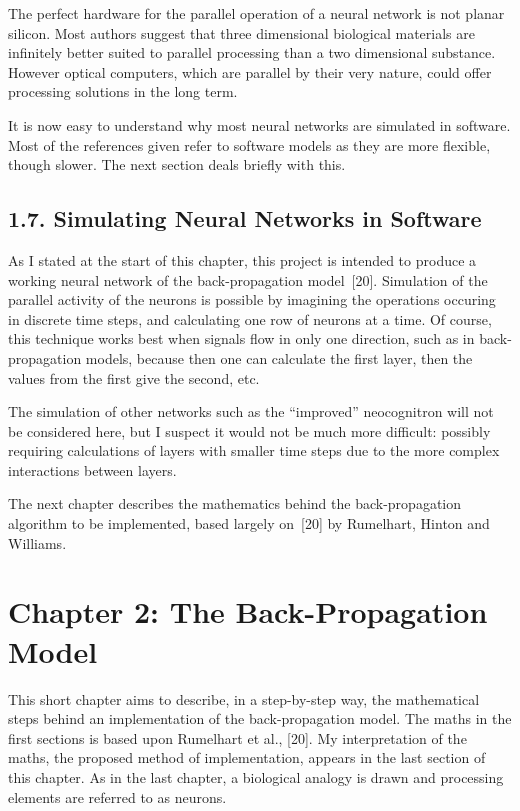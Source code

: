 \documentclass[12pt]{report}
\begin{document}
The perfect hardware for the parallel operation of a neural network is not planar
silicon.
Most authors suggest that three dimensional biological materials are
infinitely better suited to parallel processing than a two dimensional
substance.
However optical computers, which are parallel by their very nature, could
offer processing solutions in the long term.

It is now easy to understand why most neural networks are simulated in software.
Most of the references given refer to software models as they are more
flexible, though slower.
The next section deals briefly with this.

\section{1.7. Simulating Neural Networks in Software}

As I stated at the start of this chapter, this project is intended to
produce a working neural network of the back-propagation model~[20].
Simulation of the parallel activity of the neurons is possible by 
imagining the operations
occuring in discrete time steps, and calculating one row of neurons at a
time.
Of course, this technique works best when signals flow in only one direction,
such as in back-propagation models, because then one can calculate the
first layer, then the values from the first give the second, etc.

The simulation of other networks such as the ``improved'' neocognitron
will not be considered here, but I suspect it would not be much more
difficult: possibly requiring calculations of layers with smaller time
steps due to the more complex interactions between layers.

The next chapter describes the mathematics behind the back-propagation
algorithm to be implemented, based largely on~[20] by Rumelhart, Hinton
and Williams.

\chapter{Chapter 2: The Back-Propagation Model}

This short chapter aims to describe, in a step-by-step way,
the mathematical steps behind an implementation of the
back-propagation model.
The maths in the first sections is based upon Rumelhart et al., [20].
My interpretation of the maths, the proposed method of implementation,
appears in the last section of this chapter.
As in the last chapter, a biological analogy is drawn and processing
elements are referred to as neurons.
\end{document}
